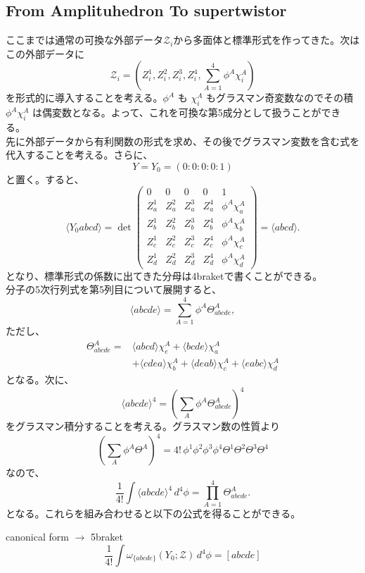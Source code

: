 \documentclass[uplatex,dvipdfmx,a4paper,11pt]{jsarticle}
\numberwithin{equation}{section}
\begin{document}
\subsection{From Amplituhedron To supertwistor}
ここまでは通常の可換な外部データ$\mathcal{Z}_i$から多面体と標準形式を作ってきた。次は
この外部データに
\[
\mathcal Z_i
=
\left(
Z_i^1,Z_i^2,Z_i^3,Z_i^4,
\sum_{A=1}^{4}\phi^A\chi_i^A
\right)
\]
を形式的に導入することを考える。\(\phi^A\) も \(\chi_i^A\) もグラスマン奇変数なのでその積 \(\phi^A\chi_i^A\) は偶変数となる。よって、これを可換な第5成分として扱うことができる。\\
先に外部データから有利関数の形式を求め、その後でグラスマン変数を含む式を代入することを考える。さらに、
\[
Y=Y_0=(0:0:0:0:1)
\]
と置く。すると、
\[
\langle Y_0abcd\rangle
=
\det
\begin{pmatrix}
0&0&0&0&1\\
Z_a^1&Z_a^2&Z_a^3&Z_a^4&\phi^A\chi_a^A\\
Z_b^1&Z_b^2&Z_b^3&Z_b^4&\phi^A\chi_b^A\\
Z_c^1&Z_c^2&Z_c^3&Z_c^4&\phi^A\chi_c^A\\
Z_d^1&Z_d^2&Z_d^3&Z_d^4&\phi^A\chi_d^A
\end{pmatrix}
=
\langle abcd\rangle.
\]
となり、標準形式の係数に出てきた分母は4braketで書くことができる。\\
分子の5次行列式を第5列目について展開すると、
\[
\langle abcde\rangle
=
\sum_{A=1}^{4}\phi^A\Theta_{abcde}^A,
\]
ただし、
\[
\begin{aligned}
\Theta_{abcde}^A
={}&
\langle abcd\rangle\chi_e^A
+\langle bcde\rangle\chi_a^A\\
&+\langle cdea\rangle\chi_b^A
+\langle deab\rangle\chi_c^A
+\langle eabc\rangle\chi_d^A
\end{aligned}
\]
となる。次に、
\[
\langle abcde\rangle^4
=
\left(\sum_A\phi^A\Theta_{abcde}^A\right)^4
\]
をグラスマン積分することを考える。グラスマン数の性質より
\[
\left(\sum_A\phi^A\Theta^A\right)^4
=
4!\,
\phi^1\phi^2\phi^3\phi^4
\Theta^1\Theta^2\Theta^3\Theta^4
\]
なので、
\[
\frac1{4!}
\int\langle abcde\rangle^4\,d^4\phi
=
\prod_{A=1}^{4}\Theta_{abcde}^A.
\]
となる。これらを組み合わせると以下の公式を得ることができる。
\begin{mythm}{canonical form $\to$ 5braket}
  \[
\frac1{4!}
\int
\omega_{\{abcde\}}(Y_0;\mathcal Z)\,d^4\phi
=
[abcde]
\]
\end{mythm}
\end{document}

